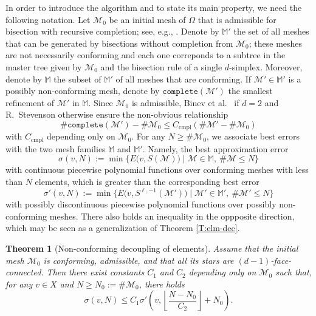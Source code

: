 \documentclass[a4paper]{amsart}
\numberwithin{equation}{section}
\theoremstyle{plain}
\newtheorem{thm}{Theorem}[section]
\theoremstyle{definition}
\begin{document}
In order to introduce the algorithm and to state its main property, we need the 
following notation.  Let ${\mathcal{M}}_0$ be an initial mesh of $\Omega$ that is 
admissible for bisection with recursive completion; see, e.g., \cite[Assumption 
11.1 on p.~453]{Nochetto.Siebert.Veeser:09}.  Denote by 
${\mathbb{M}}'$ the set of all meshes that can be generated by bisections without 
completion from ${\mathcal{M}}_0$; these meshes are not necessarily conforming and 
each one correponds to a subtree in the master tree given by ${\mathcal{M}}_0$ and the 
bisection rule of a single $d$-simplex.  Moreover, denote by ${\mathbb{M}}$ the 
subset of ${\mathbb{M}}'$ of all meshes that are conforming.  If 
${\mathcal{M}}'\in{\mathbb{M}}'$ is a possibly non-conforming mesh, denote by 
$\texttt{complete}({\mathcal{M}}')$ the smallest refinement of ${\mathcal{M}}'$ in ${\mathbb{M}}$.  
Since ${\mathcal{M}}_0$ is admissible, Binev et al.\ 
\cite[Theorem~2.4]{Binev.Dahmen.DeVore:04} if 
$d=2$ and R.~Stevenson \cite[Theorem~6.1]{Stevenson:08} otherwise ensure the 
non-obvious relationship
\begin{equation}\label{complete}
 \#\texttt{complete}({\mathcal{M}}') - \#{\mathcal{M}}_0
 \leq
 {{C_\text{cmpl}}} (\#{\mathcal{M}}' - \#{\mathcal{M}}_0)
\end{equation}
with ${{C_\text{cmpl}}}$ depending only on ${\mathcal{M}}_0$.  For any $N\geq\#{\mathcal{M}}_0$, we 
associate best errors with the two mesh families ${\mathbb{M}}$ and ${\mathbb{M}}'$.  
Namely, the best approximation error 
\begin{equation*}
 \sigma(v,N)
 {:=}
 \min \big\{ E \big( v,{S}({\mathcal{M}}) \big)
  \mid {\mathcal{M}}\in{\mathbb{M}},\ \#{\mathcal{M}}\leq 
N \big\}
\end{equation*}
with continuous piecewise polynomial functions over conforming meshes with less 
than $N$ elements, which is greater than the corresponding best error 
\begin{equation}
\label{nlberr}
 \sigma'(v,N)
 {:=}
 \min \{ E\big( v,{S}^{{\ell},-1}({\mathcal{M}}') \big)
   \mid {\mathcal{M}}'\in{\mathbb{M}}',\ \#{\mathcal{M}}'\leq N \}
\end{equation}
with possibly discontinuous piecewise polynomial functions over possibly 
non-con\-form\-ing meshes.  There also holds an inequality in the oppposite 
direction, which may be seen as a generalization of Theorem \ref{T:elm-dec}.

\begin{thm}[Non-conforming decoupling of elements]
\label{T:n-elm-dec}
Assume that the initial mesh ${\mathcal{M}}_0$ is conforming, admissible, and that 
all its stars are $(d-1)$-face-connected.  Then there exist constants $C_1$ 
and $C_2$ depending only on ${\mathcal{M}}_0$ such that, for any $v\in X$ and 
$N\geq N_0{:=}\#{\mathcal{M}}_0$, there holds
\[
 \sigma(v,N)
 \leq
 C_1 \sigma'\left(
  v, \left\lfloor \frac{N-N_0}{C_2} \right\rfloor + N_0
  \right).
\]
\end{thm}
\end{document}
